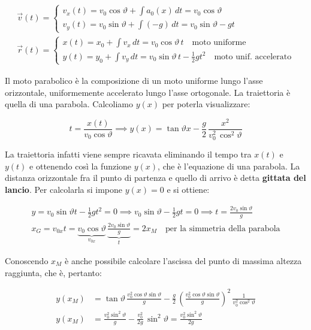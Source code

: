 \begin{gather*}
	\vec{v}(t) =
		\begin{cases}
			v_x(t)=v_0\cos\vartheta+\int a_0(x)\,dt=v_0\cos\vartheta \\
			v_y(t)=v_0\sin\vartheta+\int (-g)\,dt=v_0\sin\vartheta-gt
		\end{cases} \\
	\vec{r}(t) =
		\begin{cases}
			x(t)=x_0+\int v_x\,dt=v_0\cos\vartheta\,t \quad \text{moto uniforme} \\
			y(t)=y_0+\int v_y\,dt=v_0\sin\vartheta\,t-\frac{1}{2}gt^2 \quad \text{moto unif. accelerato}
		\end{cases}
\end{gather*}

Il moto parabolico è la composizione di un moto uniforme lungo l'asse orizzontale, uniformemente accelerato lungo l'asse ortogonale. La traiettoria è quella di una parabola. Calcoliamo $y(x)$ per poterla visualizzare:

\[
	t=\frac{x(t)}{v_0\cos\vartheta} \implies y(x)=\tan\vartheta x-\frac{g}{2} \,\frac{x^2}{v_0^2\,\cos^2\vartheta}
\]

La traiettoria infatti viene sempre ricavata eliminando il tempo tra $x(t)$ e $y(t)$ e ottenendo così la funzione $y(x)$, che è l'equazione di una parabola. La distanza orizzontale fra il punto di partenza e quello di arrivo è detta \textbf{gittata del lancio}. Per calcolarla si impone $y(x)=0$ e si ottiene:

\begin{gather*}
	y=v_0\sin\vartheta t-\frac{1}{2}gt^2=0 \implies v_0\sin\vartheta-\frac{1}{2}gt=0 \implies t=\frac{2v_0\sin\vartheta}{g} \\
	x_G=v_{0x}t=\underbrace{v_0\cos\vartheta}_{v_{0x}}\,\underbrace{\frac{2v_0\sin\vartheta}{g}}_{t}=2x_M \quad \text{per la simmetria della parabola}
\end{gather*}

Conoscendo $x_M$ è anche possibile calcolare l'ascissa del punto di massima altezza raggiunta, che è, pertanto:

\begin{align*}
	y(x_M)&=\tan\vartheta\,\frac{v_0^2\cos\vartheta \sin\vartheta}{g}-\frac{g}{2}\,\left(\frac{v_0^2\cos\vartheta \sin\vartheta}{g}\right)^2\,\frac{1}{v_0^2\cos^2\vartheta} \\
	y(x_M)&=\frac{v_0^2 \sin^2\vartheta}{g}-\frac{v_0^2}{2g}\,\sin^2\vartheta=\frac{v_0^2\sin^2\vartheta}{2g}
\end{align*}

